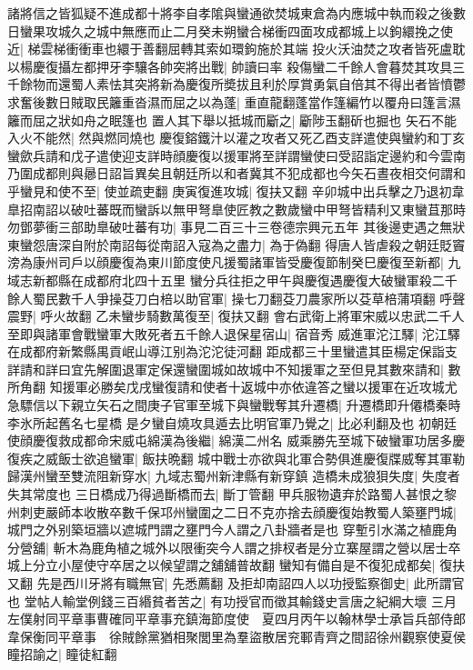 諸將信之皆狐疑不進成都十將李自孝隂與蠻通欲焚城東倉為内應城中執而殺之後數日蠻果攻城久之城中無應而止二月癸未朔蠻合梯衝四面攻成都城上以鉤繯挽之使近|{
	梯雲梯衝衝車也繯于善翻屈轉其索如環鉤施於其端}
投火沃油焚之攻者皆死盧耽以楊慶復攝左都押牙李驤各帥突將出戰|{
	帥讀曰率}
殺傷蠻二千餘人會暮焚其攻具三千餘物而還蜀人素怯其突將新為慶復所奬拔且利於厚賞勇氣自倍其不得出者皆憤鬱求奮後數日賊取民籬重沓濕而屈之以為蓬|{
	重直龍翻蓬當作篷編竹以覆舟曰篷言濕籬而屈之狀如舟之眠篷也}
置人其下舉以抵城而斸之|{
	斸陟玉翻斫也掘也}
矢石不能入火不能然|{
	然與燃同燒也}
慶復鎔鐵汁以灌之攻者又死乙酉支詳遣使與蠻約和丁亥蠻歛兵請和戊子遣使迎支詳時顔慶復以援軍將至詳謂蠻使曰受詔詣定邊約和今雲南乃圍成都則與曏日詔旨異矣且朝廷所以和者冀其不犯成都也今矢石晝夜相交何謂和乎蠻見和使不至|{
	使並疏吏翻}
庚寅復進攻城|{
	復扶又翻}
辛卯城中出兵擊之乃退初韋臯招南詔以破吐蕃既而蠻訴以無甲弩臯使匠教之數歲蠻中甲弩皆精利又東蠻苴那時勿鄧夢衝三部助臯破吐蕃有功|{
	事見二百三十三卷德宗興元五年}
其後邊吏遇之無狀東蠻怨唐深自附於南詔每從南詔入寇為之盡力|{
	為于偽翻}
得唐人皆虐殺之朝廷貶竇滂為康州司戶以顔慶復為東川節度使凡援蜀諸軍皆受慶復節制癸巳慶復至新都|{
	九域志新都縣在成都府北四十五里}
蠻分兵往拒之甲午與慶復遇慶復大破蠻軍殺二千餘人蜀民數千人爭操芟刀白棓以助官軍|{
	操七刀翻芟刀農家所以芟草棓蒲項翻}
呼聲震野|{
	呼火故翻}
乙未蠻步騎數萬復至|{
	復扶又翻}
會右武衛上將軍宋威以忠武二千人至即與諸軍會戰蠻軍大敗死者五千餘人退保星宿山|{
	宿音秀}
威進軍沱江驛|{
	沱江驛在成都府新繁縣禺貢岷山導江别為沱沱徒河翻}
距成都三十里蠻遣其臣楊定保詣支詳請和詳曰宜先解圍退軍定保還蠻圍城如故城中不知援軍之至但見其數來請和|{
	數所角翻}
知援軍必勝矣戊戌蠻復請和使者十返城中亦依違答之蠻以援軍在近攻城尤急驃信以下親立矢石之間庚子官軍至城下與蠻戰奪其升遷橋|{
	升遷橋即升僊橋秦時李氷所起舊名七星橋}
是夕蠻自燒攻具遁去比明官軍乃覺之|{
	比必利翻及也}
初朝廷使顔慶復救成都命宋威屯綿漢為後繼|{
	綿漢二州名}
威乘勝先至城下破蠻軍功居多慶復疾之威飯士欲追蠻軍|{
	飯扶晩翻}
城中戰士亦欲與北軍合勢俱進慶復牒威奪其軍勒歸漢州蠻至雙流阻新穿水|{
	九域志蜀州新津縣有新穿鎮}
造橋未成狼狽失度|{
	失度者失其常度也}
三日橋成乃得過斷橋而去|{
	斷丁管翻}
甲兵服物遺弃於路蜀人甚恨之黎州刺吏嚴師本收散卒數千保邛州蠻圍之二日不克亦捨去顔慶復始教蜀人築壅門城|{
	城門之外别築垣牆以遮城門謂之壅門今人謂之八卦牆者是也}
穿塹引水滿之植鹿角分營舖|{
	斬木為鹿角植之城外以限衝突今人謂之排杈者是分立寨屋謂之營以居士卒城上分立小屋使守卒居之以候望謂之舖舖普故翻}
蠻知有備自是不復犯成都矣|{
	復扶又翻}
先是西川牙將有職無官|{
	先悉薦翻}
及拒却南詔四人以功授監察御史|{
	此所謂官也}
堂帖人輸堂例錢三百緡貧者苦之|{
	有功授官而徵其輸錢史言唐之紀綱大壞}
三月左僕射同平章事曹確同平章事充鎮海節度使　夏四月丙午以翰林學士承旨兵部侍郎韋保衡同平章事　徐賊餘黨猶相聚閭里為羣盜散居兖鄆青齊之間詔徐州觀察使夏侯瞳招諭之|{
	瞳徒紅翻}
